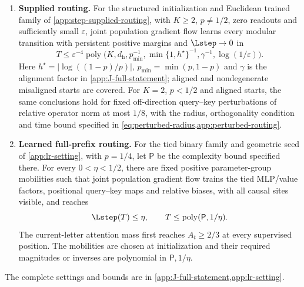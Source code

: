\begin{table}[t]
\centering\small
{}
\caption{Two complementary convergence settings. Supplied routing includes fixed query--key robustness. Full-prefix routing uses a different planted tied feature and unequal fixed mobilities.}
\label{tab:step-settings}
\end{table}

\begin{theorem}
\label{thm:joint}
\begin{enumerate}[label=(\roman*),leftmargin=*,itemsep=3pt,topsep=3pt]
\item \textbf{Supplied routing.} For the structured initialization and Euclidean
trained family of \cref{app:step-supplied-routing}, with $K\ge2$, $p\ne1/2$,
zero readouts and sufficiently small $\varepsilon$, joint population gradient
flow learns every modular transition with persistent positive margins and
$\Lstep\to0$ in
\[
 T\le\varepsilon^{-4}\operatorname{poly}
 \bigl(K,d_{\mathrm h},p_{\min}^{-1},\min\{1,h^\star\}^{-1},
 \gamma^{-1},\log(1/\varepsilon)\bigr).
\]
Here $h^\star=|\log((1-p)/p)|$, $p_{\min}=\min(p,1-p)$ and $\gamma$
is the alignment factor in \cref{app:J-full-statement}; aligned and
nondegenerate misaligned starts are covered.
For $K=2$, $p<1/2$ and aligned starts, the same conclusions hold for
fixed off-direction query--key perturbations of relative operator norm
at most $1/8$, with the radius, orthogonality condition and time bound
specified in \cref{eq:perturbed-radius,app:perturbed-routing}.

\item \textbf{Learned full-prefix routing.} For the tied binary family and
geometric seed of \cref{app:lr-setting}, with $p=1/4$, let $\mathsf P$ be the
complexity bound specified there. For every $0<\eta<1/2$, there are fixed
positive parameter-group mobilities such that joint population gradient flow
trains the tied MLP/value factors, positional query--key maps and relative
biases, with all causal sites visible, and reaches
\[
 \Lstep(T)\le\eta,\qquad T\le\operatorname{poly}(\mathsf P,1/\eta).
\]
The current-letter attention mass first reaches $A_t\ge2/3$ at every
supervised position. The mobilities are chosen at initialization and their
required magnitudes or inverses are polynomial in $\mathsf P,1/\eta$.
\end{enumerate}
The complete settings and bounds are in \cref{app:J-full-statement,app:lr-setting}.
\end{theorem}

